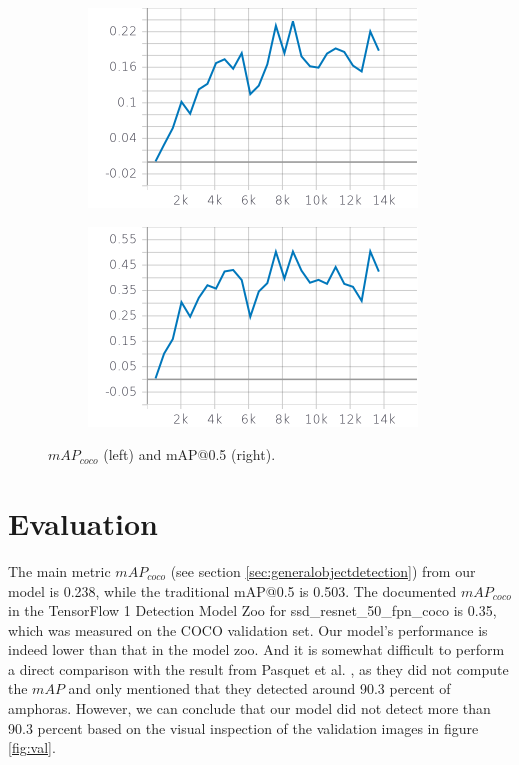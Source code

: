 \documentclass[a4paper, 11pt, oneside]{article}
\begin{document}
\begin{figure}[ht]
  \centering
  \begin{subfigure}[ht]{0.4\textwidth}
      \centering
      \includegraphics[width=\textwidth]{mapcoco.png}
  \end{subfigure}
  \bigskip
  \begin{subfigure}[ht]{0.4\textwidth}
      \centering
      \includegraphics[width=\textwidth]{map50.png}
  \end{subfigure}
  \caption{$mAP_{coco}$ (left) and mAP@0.5 (right).}
\end{figure}

\section{Evaluation}

The main metric $mAP_{coco}$ (see section \ref{sec:generalobjectdetection}) from our model is 0.238, while the
traditional mAP@0.5 is 0.503. The documented $mAP_{coco}$ in the TensorFlow 1 Detection Model Zoo for
ssd\_resnet\_50\_fpn\_coco is 0.35, which was measured on the COCO validation set. Our model's performance is indeed
lower than that in the model zoo. And it is somewhat difficult to perform a direct comparison with the result from
Pasquet et al. \cite{pasquet2017amphora}, as they did not compute the $mAP$ and only mentioned that they detected
around 90.3 percent of amphoras. However, we can conclude that our model did not detect more than 90.3 percent based
on the visual inspection of the validation images in figure \ref{fig:val}.
\end{document}
